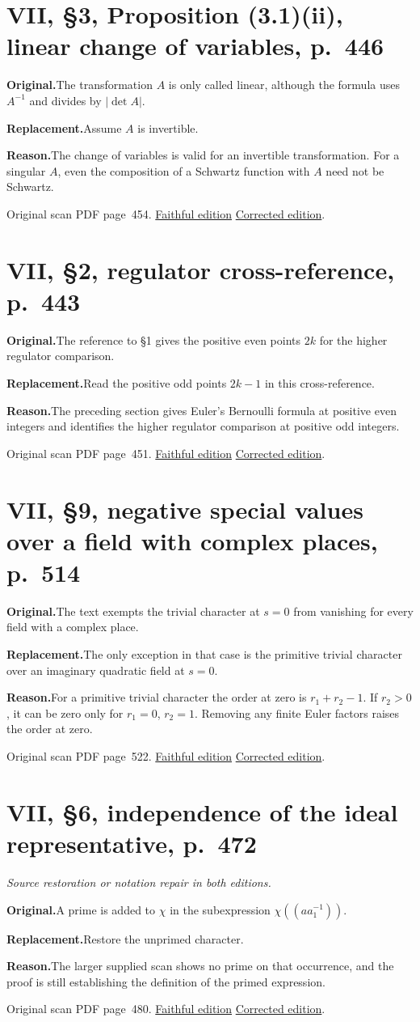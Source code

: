 \documentclass[11pt,a4paper]{article}
\newcommand{\original}{\par\smallskip\noindent\textbf{Original.}\enspace}
\newcommand{\replacement}{\par\smallskip\noindent\textbf{Replacement.}\enspace}
\newcommand{\reason}{\par\smallskip\noindent\textbf{Reason.}\enspace}
\newcommand{\editionlink}[3]{\href{#1\#errata.#2}{#3}}
\newcommand{\location}[2]{%
  \par\smallskip\noindent Original scan PDF page~#2.\enspace
  \editionlink{Neukirch_Faithful.pdf}{#1}{Faithful edition}
  \quad\editionlink{Neukirch_Corrected.pdf}{#1}{Corrected edition}.}
\begin{document}
\setcounter{section}{167}
\section{VII, \S3, Proposition (3.1)(ii), linear change of variables, p.~446}\label{errata:item:168}

\original The transformation $A$ is only called linear, although the formula uses $A^{-1}$ and divides by $|\det A|$.
\replacement Assume $A$ is invertible.
\reason The change of variables is valid for an invertible transformation. For a singular $A$, even the composition of a Schwartz function with $A$ need not be Schwartz.
\location{168}{454}

\setcounter{section}{168}
\section{VII, \S2, regulator cross-reference, p.~443}\label{errata:item:169}

\original The reference to \S1 gives the positive even points $2k$ for the higher regulator comparison.
\replacement Read the positive odd points $2k-1$ in this cross-reference.
\reason The preceding section gives Euler\textquoteright{}s Bernoulli formula at positive even integers and identifies the higher regulator comparison at positive odd integers.
\location{169}{451}

\setcounter{section}{169}
\section{VII, \S9, negative special values over a field with complex places, p.~514}\label{errata:item:170}

\original The text exempts the trivial character at $s=0$ from vanishing for every field with a complex place.
\replacement The only exception in that case is the primitive trivial character over an imaginary quadratic field at $s=0$.
\reason For a primitive trivial character the order at zero is $r_1+r_2-1$. If $r_2>0$, it can be zero only for $r_1=0$, $r_2=1$. Removing any finite Euler factors raises the order at zero.
\location{170}{522}

\setcounter{section}{170}
\section{VII, \S6, independence of the ideal representative, p.~472}\label{errata:item:171}
\noindent\emph{Source restoration or notation repair in both editions.}\par
\original A prime is added to $\chi$ in the subexpression $\chi((aa_1^{-1}))$.
\replacement Restore the unprimed character.
\reason The larger supplied scan shows no prime on that occurrence, and the proof is still establishing the definition of the primed expression.
\location{171}{480}
\end{document}
